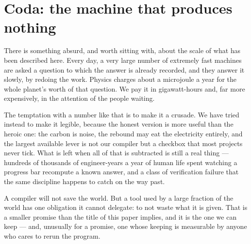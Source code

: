 \documentclass[11pt,a4paper]{article}
\begin{document}
\section{Coda: the machine that produces nothing}
There is something absurd, and worth sitting with, about the scale of what has been described here. Every day, a very large number of extremely fast machines are asked a question to which the answer is already recorded, and they answer it slowly, by redoing the work. Physics charges about a microjoule a year for the whole planet's worth of that question. We pay it in gigawatt-hours and, far more expensively, in the attention of the people waiting.


The temptation with a number like that is to make it a crusade. We have tried instead to make it legible, because the honest version is more useful than the heroic one: the carbon is noise, the rebound may eat the electricity entirely, and the largest available lever is not our compiler but a checkbox that most projects never tick. What is left when all of that is subtracted is still a real thing --- hundreds of thousands of engineer-years a year of human life spent watching a progress bar recompute a known answer, and a class of verification failure that the same discipline happens to catch on the way past.


A compiler will not save the world. But a tool used by a large fraction of the world has one obligation it cannot delegate: to not waste what it is given. That is a smaller promise than the title of this paper implies, and it is the one we can keep --- and, unusually for a promise, one whose keeping is measurable by anyone who cares to rerun the program.
\end{document}
